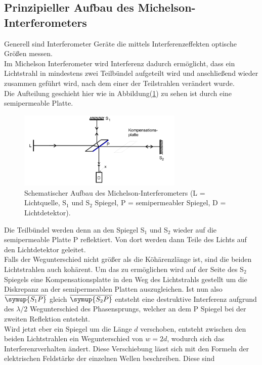     \subsection{Prinzipieller Aufbau des Michelson-Interferometers }

        \noindent Generell sind Interferometer Geräte die mittels Interferenzeffekten optische Größen messen.\\ Im Michelson Interferometer wird 
        Interferenz dadurch ermöglicht, dass ein Lichtstrahl in mindestens zwei Teilbündel aufgeteilt wird und anschließend wieder zusammen geführt wird, nach  
        dem einer der Teilstrahlen verändert wurde.\\ Die Aufteilung geschieht hier wie in Abbildung(\ref{img:4}) zu sehen ist 
        durch eine semipermeable Platte.

        \begin{figure}[ht]
            \centering
            \includegraphics[width=0.7\textwidth]{latex/images/PrinAuf.PNG}
            \caption{Schematischer Aufbau des Michelson-Interferometers (L = Lichtquelle, S$_1$ und S$_2$ Spiegel, P = semipermeabler Spiegel, 
            D = Lichtdetektor)\protect \cite{V401}.}
            \label{img:4}
        \end{figure}

        \noindent Die Teilbündel werden denn an den Spiegel S$_1$ und S$_2$ wieder auf die semipermeable Platte P reflektiert. Von dort werden dann 
        Teile des Lichts auf den Lichtdetektor geleitet.\\ Falls der Wegunterschied nicht größer als die Köhärenzlänge ist, sind die 
        beiden Lichtstrahlen auch kohärent. Um das zu ermöglichen wird auf der Seite des S$_2$ Spiegels eine Kompensationsplatte in den 
        Weg des Lichtstrahls gestellt um die Diskrepanz an der semipermeablen Platten auszugleichen. Ist nun also $\overline{\symup{S_1P}}$ 
        gleich $\overline{\symup{S_2P}}$ entsteht eine destruktive Interferenz aufgrund des $\lambda / 2$ Wegunterschied des Phasensprungs, welcher
        an dem P Spiegel bei der zweiten Reflektion entsteht.\\
        Wird jetzt eber ein Spiegel um die Länge $d$ verschoben, entsteht zwischen den beiden 
        Lichtstrahlen ein Wegunterschied von $w = 2d$, wodurch sich das Interferenzverhalten ändert. Diese Verschiebung lässt sich mit den 
        Formeln der elektrischen Feldstärke der einzelnen Wellen beschreiben. Diese sind

